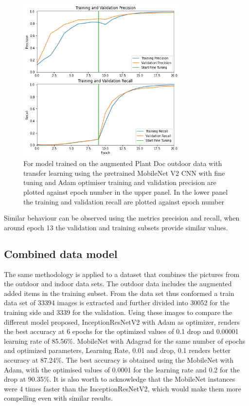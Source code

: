 \documentclass[conference]{IEEEtran}
\begin{document}
\begin{figure}[htbp]
\centerline{\includegraphics[width=8.5cm]{ModelOutdoorsMobileNetOtherMetricschart.png}}
\caption{For model trained on the augmented Plant Doc outdoor data with transfer learning using the pretrained MobileNet V2 CNN with fine tuning and Adam optimiser training and validation precision are plotted against epoch number in the upper panel. In the lower panel the training and validation recall are plotted against epoch number}
\label{fig}
\end{figure}

Similar behaviour can be observed using the metrics precision and recall, when around epoch 13 the validation and training subsets provide similar values. 

\subsection{Combined data model}

The same methodology is applied to a dataset that combines the pictures from the outdoor and indoor data sets. The outdoor data includes the augmented added items in the training subset. From the data set thus conformed a train data set of 33394 images is extracted and further divided into 30052 for the training side and 3339 for the validation. Using these images to compare the different model proposed, InceptionResNetV2 with Adam as optimizer, renders the best accuracy at 6 epochs for the optimized values of 0.1 drop and 0.00001 learning rate of 85.56\%. MobileNet with Adagrad  for the same number of epochs and optimized parameters, Learning Rate, 0.01 and drop, 0.1 renders better accuracy at 87.24\%. The best accuracy is obtained using the MobileNet with Adam, with the optimised values of 0.0001 for the learning rate and 0.2 for the drop at 90.35\%. It is also worth to acknowledge that the MobileNet instances were 4 times faster than the InceptionResNetV2, which would make them more compelling even with similar results. \
\end{document}
